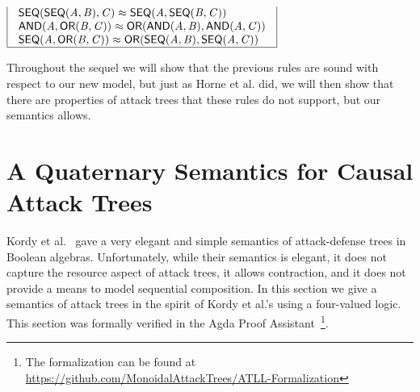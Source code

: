 \documentclass{llncs}
\newcommand{\ATermsnt}[1]{\mathit{#1}}
\begin{document}
\begin{definition}
\begin{center}
\begin{math}
\begin{array}{|l|l|}
\begin{array}{lll}
            \mathsf{SEQ}(  \mathsf{SEQ}( \ATermsnt{A} , \ATermsnt{B} )  , \ATermsnt{C} )   \approx   \mathsf{SEQ}( \ATermsnt{A} ,  \mathsf{SEQ}( \ATermsnt{B} , \ATermsnt{C} )  )  \\                
            \mathsf{AND}( \ATermsnt{A} ,  \mathsf{OR}( \ATermsnt{B} , \ATermsnt{C} )  )   \approx   \mathsf{OR}(  \mathsf{AND}( \ATermsnt{A} , \ATermsnt{B} )  ,  \mathsf{AND}( \ATermsnt{A} , \ATermsnt{C} )  )  \\
            \mathsf{SEQ}( \ATermsnt{A} ,  \mathsf{OR}( \ATermsnt{B} , \ATermsnt{C} )  )   \approx   \mathsf{OR}(  \mathsf{SEQ}( \ATermsnt{A} , \ATermsnt{B} )  ,  \mathsf{SEQ}( \ATermsnt{A} , \ATermsnt{C} )  )  \\
        \end{array}\\
        \hline
      \end{array}
    \end{math}  
  \end{center}
\end{definition}
Throughout the sequel we will show that the previous rules are sound
with respect to our new model, but just as Horne et
al. \cite{horne2017semantics} did, we will then show that there are
properties of attack trees that these rules do not support, but our
semantics allows.



\vspace{-7px}
\section{A Quaternary Semantics for Causal Attack Trees}
\label{sec:a_quaternary_semantics_for_causal_attack_trees}
\newcommand{\forth}{\frac{1}{4}}
\newcommand{\half}{\frac{1}{2}}

Kordy et al.~\cite{Kordy:2012} gave a very elegant and simple
semantics of attack-defense trees in Boolean algebras.  Unfortunately,
while their semantics is elegant, it does not capture the resource
aspect of attack trees, it allows contraction, and it does not provide
a means to model sequential composition.  In this section we give a
semantics of attack trees in the spirit of Kordy et al.'s using a
four-valued logic.  This section was formally verified in the Agda
Proof Assistant~\cite{Norell:2009}\footnote{The formalization can be
  found at
  \url{https://github.com/MonoidalAttackTrees/ATLL-Formalization}}.
\end{document}
